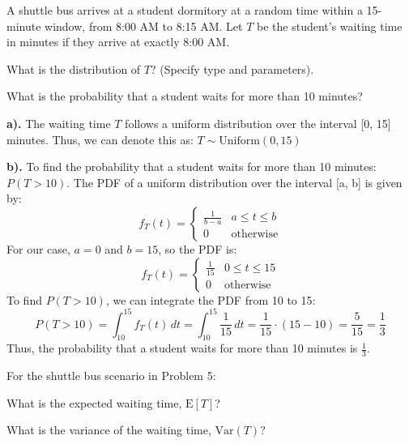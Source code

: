 \documentclass[a4paper, 10pt]{article}
\begin{document}
\begin{problem}
A shuttle bus arrives at a student dormitory at a random time within a 15-minute window, from 8:00 AM to 8:15 AM.
Let \( T \) be the student's waiting time in minutes if they arrive at exactly 8:00 AM.
\begin{subproblems}
    \item What is the distribution of \( T \)? (Specify type and parameters).
    \item What is the probability that a student waits for more than 10 minutes?
\end{subproblems}
\end{problem}

\begin{solution}
\textbf{a).} The waiting time \( T \) follows a uniform distribution over the interval [0, 15] minutes.
Thus, we can denote this as: \( T \sim \text{Uniform}(0, 15) \)

\vspace{3mm}

\textbf{b).} To find the probability that a student waits for more than 10 minutes: \( P(T > 10) \).
The PDF of a uniform distribution over the interval [a, b] is given by:
\[
f_T(t) = \begin{cases}
    \frac{1}{b-a} & a \leq t \leq b \\
    0 & \text{otherwise}
\end{cases}
\]
For our case, \( a = 0 \) and \( b = 15 \), so the PDF is:
\[
f_T(t) = \begin{cases}
    \frac{1}{15} & 0 \leq t \leq 15 \\
    0 & \text{otherwise}
\end{cases}
\]
To find \( P(T > 10) \), we can integrate the PDF from 10 to 15:
\[
P(T > 10) = \int_{10}^{15} f_T(t) \, dt = \int_{10}^{15} \frac{1}{15} \, dt = \frac{1}{15} \cdot (15 - 10) = \frac{5}{15} = \frac{1}{3}
\]
Thus, the probability that a student waits for more than 10 minutes is \( \boxed{\frac{1}{3}} \).
\end{solution}


\begin{problem}
For the shuttle bus scenario in Problem 5:
\begin{subproblems}
    \item What is the expected waiting time, \( \text{E}[T] \)?
    \item What is the variance of the waiting time, \( \text{Var}(T) \)?
\end{subproblems}
\end{problem}
\end{document}
